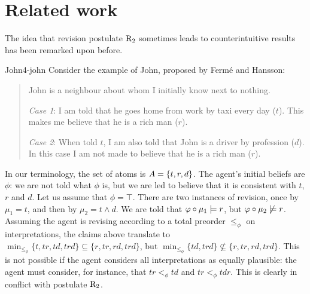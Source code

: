 









\section{Related work}\label{sec:4-rw}
The idea that revision postulate $\mathrm{R}_{2}$ sometimes leads to counterintuitive results 
has been remarked upon before.

\begin{xmpl}{John}{4-john}
	Consider the example of John, proposed by Ferm\'e and Hansson:

	\begin{quote}
		John is a neighbour about whom I initially know next to nothing.

		\emph{Case 1}: I am told that he goes home from work by taxi every day ($t$). 
		This makes me believe that he is a rich man ($r$).

		\emph{Case 2}: When told $t$, I am also told that John is a driver by profession ($d$). 
		In this case I am not made to believe that he is a rich man ($r$).
		\cite[p.~45]{FermeH18}
	\end{quote}
	
	In our terminology, the set of atoms is $A=\{t,r,d\}$.
	The agent's initial beliefs are $\phi$: we are not told what $\phi$ is,
	but we are led to believe that it is consistent with $t$, $r$ and $d$.
	Let us assume that $\phi=\top$.
	There are two instances of revision, once by $\mu_1 = t$,
	and then by $\mu_2 = t\land d$.
	We are told that $\varphi\circ\mu_1\models r$, but $\varphi\circ\mu_2\not\models r$.
	Assuming the agent is revising according to a total preorder $\le_{\phi}$ on interpretations,
	the claims above translate to 
	$\min_{\le_{\phi}}\{t,tr,td,trd\} \subseteq\{r,tr,rd,trd\}$,
	but $\min_{\le_{\phi}}\{td,trd\} \nsubseteq\{r,tr,rd,trd\}$.
	This is not possible if the agent considers all interpretations as equally plausible:
	the agent must consider, for instance, 
	that $tr<_{\phi}td$ and $tr<_{\phi}tdr$.
	This is clearly in conflict with postulate $\mathrm{R}_{2}$.
\end{xmpl}

